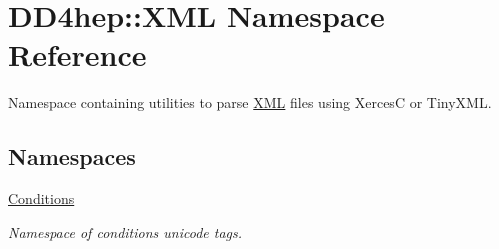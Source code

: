 \hypertarget{namespace_d_d4hep_1_1_x_m_l}{}\section{D\+D4hep\+:\+:X\+ML Namespace Reference}
\label{namespace_d_d4hep_1_1_x_m_l}


Namespace containing utilities to parse \hyperlink{namespace_d_d4hep_1_1_x_m_l}{X\+ML} files using XercesC or Tiny\+X\+ML.  


\subsection*{Namespaces}
\begin{DoxyCompactItemize}
\item 
 \hyperlink{namespace_d_d4hep_1_1_x_m_l_1_1_conditions}{Conditions}
\begin{DoxyCompactList}\small\item\em Namespace of conditions unicode tags. \end{DoxyCompactList}\end{DoxyCompactItemize}
